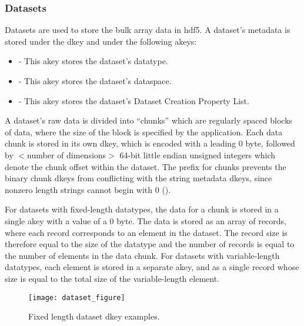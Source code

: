 \documentclass[../design_doc.tex]{subfiles}
\begin{document}
\newpage

\subsubsection{Datasets}

Datasets are used to store the bulk array data in \acrshort{hdf5}. A dataset's metadata is stored under the  \gls{dkey} and under the following \glspl{akey}:

\begin{itemize}
    \item {} - This \gls{akey} stores the dataset's datatype.
    \item {} - This \gls{akey} stores the dataset's dataspace.
    \item {} - This \gls{akey} stores the dataset's Dataset Creation Property List.
\end{itemize}

A dataset's raw data is divided into ``chunks'' which are regularly spaced blocks of data, where the size of the block is specified by the application. Each data chunk is stored in its own \gls{dkey}, which is encoded with a leading 0 byte, followed by $<$number of dimensions$>$ 64-bit little endian unsigned integers which denote the chunk offset within the dataset. The  prefix for chunks prevents the binary chunk \glspl{dkey} from conflicting with the string metadata \glspl{dkey}, since nonzero length strings cannot begin with 0 (\mintcinline{\0}).

For datasets with fixed-length datatypes, the data for a chunk is stored in a single \gls{akey} with a value of a 0 byte. The data is stored as an array of records, where each record corresponds to an element in the dataset. The record size is therefore equal to the size of the datatype and the number of records is equal to the number of elements in the data chunk. For datasets with variable-length datatypes, each element is stored in a separate \gls{akey}, and as a single record whose size is equal to the total size of the variable-length element.

\begin{figure}
\texttt{[image: dataset\_figure]}
\caption{Fixed length dataset dkey examples.}
\label{fig:dataset}
\end{figure}

\newpage
\end{document}
